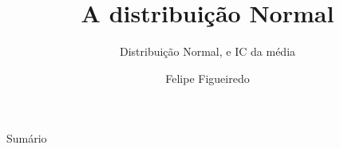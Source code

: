 \documentclass{beamer}
\title%
{A distribuição Normal}
\subtitle
{Distribuição Normal, e IC da média} %
\author%
{Felipe Figueiredo}%
\institute[] %
{
}
\date%
{}
\begin{document}
\begin{frame}
  \titlepage
\end{frame}

\begin{frame}{Sumário}
  \tableofcontents
\end{frame}







\end{document}
